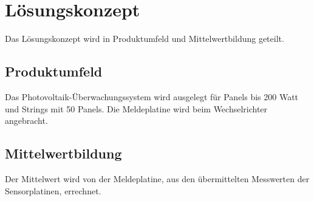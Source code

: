 \section{L\"osungskonzept}
Das Lösungskonzept wird in Produktumfeld und Mittelwertbildung geteilt.
\subsection{Produktumfeld}
Das Photovoltaik-Überwachungssystem wird ausgelegt für Panels bis 200 Watt und Strings mit 50 Panels. Die Meldeplatine wird beim Wechselrichter angebracht.
\subsection{Mittelwertbildung}
Der Mittelwert wird von der Meldeplatine, aus den übermittelten Messwerten der Sensorplatinen, errechnet. 